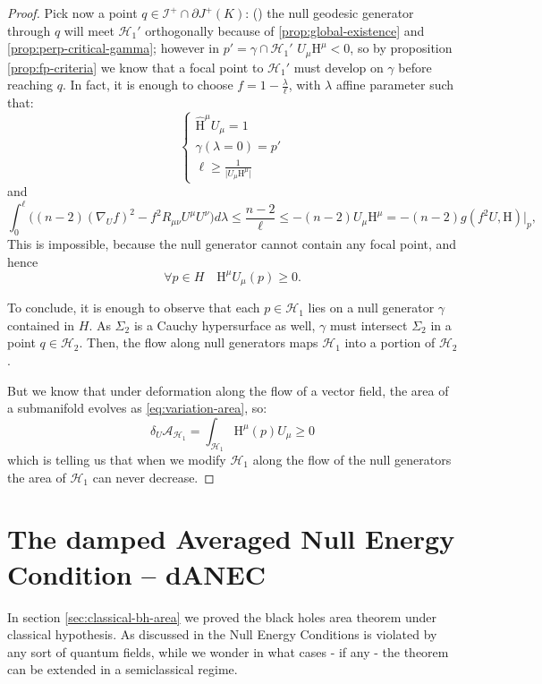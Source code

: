 \begin{proof}
	Pick now a point \(q \in \mathscr{I}^+ \cap \partial J^+(K)\):  ()
	the null geodesic generator through \(q\) will meet \(\mathscr{H}_1'\) orthogonally because of \ref{prop:global-existence} and \ref{prop:perp-critical-gamma}; however in \(p' = \gamma \cap \mathscr{H}_1'\) \(U_{\mu}\mathrm{H}^{\mu} < 0\), so by proposition \ref{prop:fp-criteria} we know that a focal point to \(\mathscr{H}_1'\) must develop on \(\gamma\) before reaching \(q\). In fact, it is enough to choose \(f = 1 - \frac{\lambda}{\ell}\), with \(\lambda\) affine parameter such that:
	\[
	\begin{cases}
	\hat{\mathrm{H}}^{\mu}U_{\mu} = 1 \\
	\gamma(\lambda = 0) = p' \\
	\ell \ge  \frac{1}{\vert U_{\mu}\mathrm{H}^{\mu} \vert}
	\end{cases}
	\]
	and 
	\[
	\int_{0}^{\ell} \big((n -2)(\nabla_Uf)^2 - f^2R_{\mu\nu}U^{\mu}U^{\nu} \big)d\lambda\le 
	\frac{n -2}{\ell} \le -(n -2) U_{\mu} \mathrm{H}^{\mu} =
	-(n -2) g(f^2 U, \mathrm{H})\Big\vert_{p},
	\]
	This is impossible, because the null generator cannot contain any focal point, and hence 
	\[
	\forall p \in H \quad \mathrm{H}^{\mu}U_{\mu}(p) \ge 0.
	\]
		
	To conclude, it is enough to observe that each \(p\in \mathscr{H}_1\) lies on a null generator \(\gamma\) contained in \(H\). As \(\Sigma_2\) is a Cauchy hypersurface as well, \(\gamma\) must intersect \(\Sigma_2\) in a point \(q \in \mathscr{H}_2\). Then, the flow along null generators maps \(\mathscr{H}_1\) into a portion of \(\mathscr{H}_2\).
	
	But we know that under deformation along the flow of a vector field, the area of a submanifold evolves as \ref{eq:variation-area}, so:
	\begin{equation*}
		\delta_U\mathcal{A}_{\mathscr{H}_1} = \int_{\mathscr{H}_1} \mathrm{H}^{\mu}(p)U_{\mu} \ge 0
	\end{equation*}
	which is telling us that when we modify \(\mathscr{H}_1\) along the flow of the null generators the area of \(\mathscr{H}_1\) can never decrease.
\end{proof}

\section{The damped Averaged Null Energy Condition -- dANEC}
In section \ref{sec:classical-bh-area} we proved the black holes area theorem under classical hypothesis. As discussed in %
the Null Energy Conditions is violated by any sort of quantum fields, while we wonder in what cases - if any - the theorem can be extended in a semiclassical regime.

